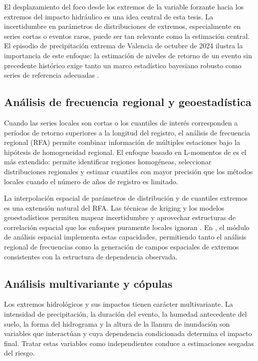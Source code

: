 El desplazamiento del foco desde los extremos de la variable forzante hacia los extremos del impacto hidráulico es una idea central de esta tesis. La incertidumbre en parámetros de distribuciones de extremos, especialmente en series cortas o eventos raros, puede ser tan relevante como la estimación central. El episodio de precipitación extrema de Valencia de octubre de 2024 ilustra la importancia de este enfoque: la estimación de niveles de retorno de un evento sin precedente histórico exige tanto un marco estadístico bayesiano robusto como series de referencia adecuadas \parencite{deljesus2025valencia}.

\subsection{Análisis de frecuencia regional y geoestadística}
\label{sec:rfa}

Cuando las series locales son cortas o los cuantiles de interés corresponden a períodos de retorno superiores a la longitud del registro, el análisis de frecuencia regional (RFA) permite combinar información de múltiples estaciones bajo la hipótesis de homogeneidad regional. El enfoque basado en L-momentos de \textcite{hosking1997rfa} es el más extendido: permite identificar regiones homogéneas, seleccionar distribuciones regionales y estimar cuantiles con mayor precisión que los métodos locales cuando el número de años de registro es limitado.

La interpolación espacial de parámetros de distribución y de cuantiles extremos es una extensión natural del RFA. Las técnicas de kriging y los modelos geoestadísticos permiten mapear incertidumbre y aprovechar estructuras de correlación espacial que los enfoques puramente locales ignoran \parencite{cooley2007bayesian}. En \hydra, el módulo de análisis espacial implementa estas capacidades, permitiendo tanto el análisis regional de frecuencias como la generación de campos espaciales de extremos consistentes con la estructura de dependencia observada.

\subsection{Análisis multivariante y cópulas}
\label{sec:cópulas}

Los extremos hidrológicos y sus impactos tienen carácter multivariante. La intensidad de precipitación, la duración del evento, la humedad antecedente del suelo, la forma del hidrograma y la altura de la llanura de inundación son variables que interactúan y cuya dependencia condicionada determina el impacto final. Tratar estas variables como independientes conduce a estimaciones sesgadas del riesgo.

